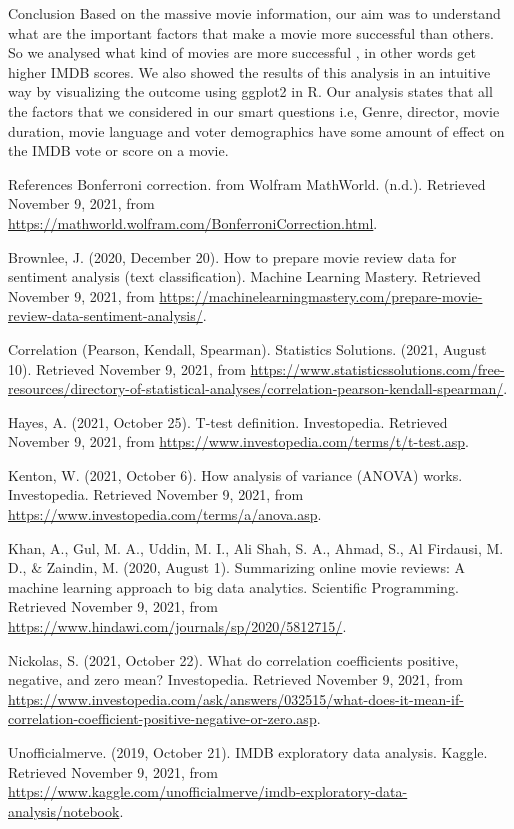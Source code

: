 \documentclass[
  ignorenonframetext,
]{beamer}
\begin{document}
\begin{frame}{Conclusion}
\protect\hypertarget{conclusion}{}
Based on the massive movie information, our aim was to understand what
are the important factors that make a movie more successful than others.
So we analysed what kind of movies are more successful , in other words
get higher IMDB scores. We also showed the results of this analysis in
an intuitive way by visualizing the outcome using ggplot2 in R. Our
analysis states that all the factors that we considered in our smart
questions i.e, Genre, director, movie duration, movie language and voter
demographics have some amount of effect on the IMDB vote or score on a
movie.
\end{frame}

\begin{frame}{References}
\protect\hypertarget{references}{}
Bonferroni correction. from Wolfram MathWorld. (n.d.). Retrieved
November 9, 2021, from
\url{https://mathworld.wolfram.com/BonferroniCorrection.html}.

Brownlee, J. (2020, December 20). How to prepare movie review data for
sentiment analysis (text classification). Machine Learning Mastery.
Retrieved November 9, 2021, from
\url{https://machinelearningmastery.com/prepare-movie-review-data-sentiment-analysis/}.

Correlation (Pearson, Kendall, Spearman). Statistics Solutions. (2021,
August 10). Retrieved November 9, 2021, from
\url{https://www.statisticssolutions.com/free-resources/directory-of-statistical-analyses/correlation-pearson-kendall-spearman/}.

Hayes, A. (2021, October 25). T-test definition. Investopedia. Retrieved
November 9, 2021, from
\url{https://www.investopedia.com/terms/t/t-test.asp}.

Kenton, W. (2021, October 6). How analysis of variance (ANOVA) works.
Investopedia. Retrieved November 9, 2021, from
\url{https://www.investopedia.com/terms/a/anova.asp}.

Khan, A., Gul, M. A., Uddin, M. I., Ali Shah, S. A., Ahmad, S., Al
Firdausi, M. D., \& Zaindin, M. (2020, August 1). Summarizing online
movie reviews: A machine learning approach to big data analytics.
Scientific Programming. Retrieved November 9, 2021, from
\url{https://www.hindawi.com/journals/sp/2020/5812715/}.

Nickolas, S. (2021, October 22). What do correlation coefficients
positive, negative, and zero mean? Investopedia. Retrieved November 9,
2021, from
\url{https://www.investopedia.com/ask/answers/032515/what-does-it-mean-if-correlation-coefficient-positive-negative-or-zero.asp}.

Unofficialmerve. (2019, October 21). IMDB exploratory data analysis.
Kaggle. Retrieved November 9, 2021, from
\url{https://www.kaggle.com/unofficialmerve/imdb-exploratory-data-analysis/notebook}.
\end{frame}
\end{document}

